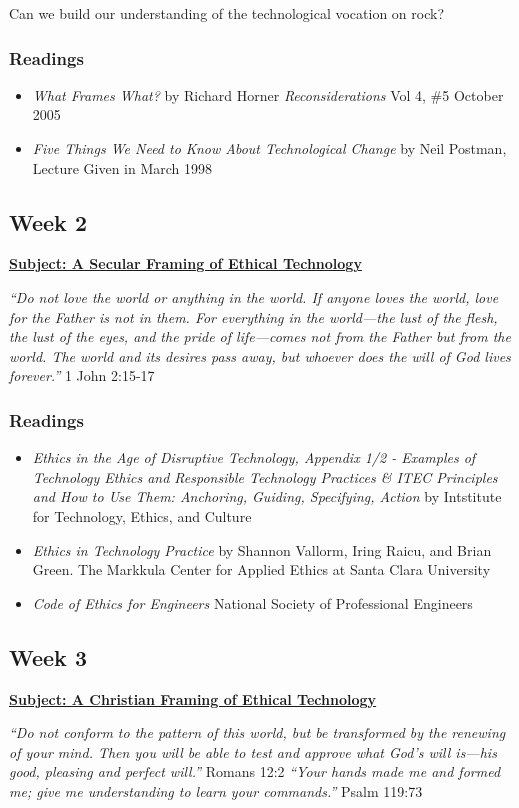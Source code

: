 \documentclass[11pt]{article}
\begin{document}
Can we build our understanding of the technological vocation on rock?
\subsubsection*{Readings}
\label{sec:orgc15d435}
\begin{itemize}
\item \emph{What Frames What?} by Richard Horner \emph{Reconsiderations} Vol 4, \#5 October
2005
\item \emph{Five Things We Need to Know About Technological Change} by Neil Postman,
Lecture Given in March 1998
\end{itemize}
\subsection*{Week 2}
\label{sec:org1dcb2e2}
\textbf{\uline{Subject: A Secular Framing of Ethical Technology}}

\begin{mdframed}
\emph{``Do not love the world or anything in the world. If anyone loves the world,
love for the Father is not in them. For everything in the world—the lust
of the flesh, the lust of the eyes, and the pride of life—comes not from the
Father but from the world. The world and its desires pass away, but whoever
does the will of God lives forever.''} 1 John 2:15-17
\end{mdframed}
\subsubsection*{Readings}
\label{sec:org4796ec5}
\begin{itemize}
\item \emph{Ethics in the Age of Disruptive Technology, Appendix 1/2 - Examples of
Technology Ethics and Responsible Technology Practices \& ITEC Principles and
How to Use Them: Anchoring, Guiding, Specifying, Action} by Intstitute for
Technology, Ethics, and Culture
\item \emph{Ethics in Technology Practice} by Shannon Vallorm, Iring Raicu, and Brian
Green. The Markkula Center for Applied Ethics at Santa Clara University
\item \emph{Code of Ethics for Engineers} National Society of Professional Engineers
\end{itemize}
\subsection*{Week 3}
\label{sec:org5fa1029}
\textbf{\uline{Subject: A Christian Framing of Ethical Technology}}
\begin{mdframed}
\emph{``Do not conform to the pattern of this world, but be transformed by the
renewing of your mind. Then you will be able to test and approve what God’s will
is—his good, pleasing and perfect will.''} Romans 12:2 \newline
\noindent \emph{``Your hands made me and formed me; give me understanding to
learn your commands.''} Psalm 119:73
\end{mdframed}
\end{document}
